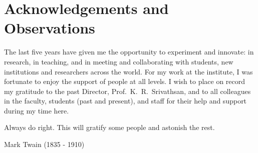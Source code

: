 \documentclass[titlepage, %
11pt, 
]{article}
\begin{document}
\section{Acknowledgements and Observations}
\label{sec:concl}

The last five years have given me the opportunity to
experiment and innovate: in research, in teaching, and in
meeting and collaborating with students, new institutions
and researchers across the world.  For my work at the
institute, I was fortunate to enjoy the support of people at
all levels.  I wish to place on record my gratitude to the
past Director, Prof.~K.~R.~Srivathsan, and to all colleagues
in the faculty, students (past and present), and staff for
their help and support during my time here.



\vfill

\epigraph {Always do right.  This will gratify some people
and astonish the rest.}  {{\sc Mark Twain} (1835 - 1910)}

\newpage


% 

\end{document}

